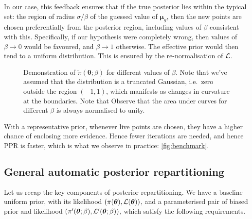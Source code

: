 \documentclass[usenatbib]{mnras}
\begin{document}
In our case, this feedback ensures that if the true posterior lies
within the typical set: the region of radius \(\sigma / \beta\) of the
guessed value of \(\bm{\mu}_{g}\), then the new points are chosen
preferentially from the posterior region, including values of
\(\beta\) consistent with this. Specifically, if our hypothesis were
completely wrong, then values of \(\beta \rightarrow 0\) would be
favoured, and $\beta\rightarrow 1$ otherwise. The effective prior
would then tend to a uniform distribution. This is ensured by the
re-normalisation of \({\cal L}\).

\begin{figure}
 
 \caption{\label{org44950de} Demonstration of
   \(\tilde{\pi}(\bm{\theta}; \beta)\) for different values of
   \(\beta\). Note that we've assumed that the distribution is a
   truncated Gaussian, i.e.~zero outside the region \((-1, 1)\), which
   manifests as changes in curvature at the boundaries. Note that
   Observe that the area under curves for different $\beta$ is always
   normalised to unity. }
\end{figure}

With a representative prior, whenever live points are chosen, they
have a higher chance of enclosing more evidence. Hence fewer
iterations are needed, and hence PPR is faster, which is what we
observe in practice: \cref{fig:benchmark}.

\subsection{General automatic posterior repartitioning}

Let us recap the key components of posterior repartitioning. We
have a baseline uniform prior, with its likelihood \((\pi(\bm{\theta}),
   \cal L (\bm{\theta}))\), and a parameterised pair of biased prior and
likelihood \((\pi'(\bm{\theta}; \beta), \cal L' (\bm{\theta}; \beta))\), which
satisfy the following requirements.
\end{document}
